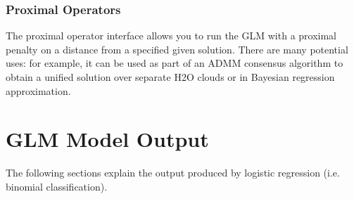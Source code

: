 \subsubsection{Proximal Operators}

The proximal operator interface allows you to run the GLM with a proximal penalty on a distance from a specified
given solution. There are many potential uses: for example, it can be used as part of an ADMM consensus algorithm
to obtain a unified solution over separate H2O clouds or in Bayesian regression approximation.


\section{GLM Model Output}

The following sections explain the output produced by logistic regression (i.e. binomial classification).

